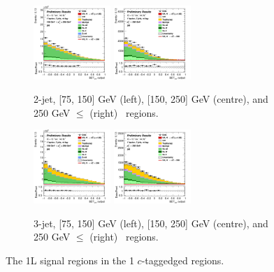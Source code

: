 \begin{figure}[h!]
    \centering
    \begin{subfigure}[b]{\textwidth}
        \centering
        \includegraphics[width=0.32\textwidth]{Images/VH/Own_fit/prefit_VHcc/Region_distmva_BMax250_BMin150_DSR_J2_TTypent_T1_L1_Y6051_Prefit.png}
        \includegraphics[width=0.32\textwidth]{Images/VH/Own_fit/prefit_VHcc/Region_distmva_BMin250_DSR_J2_TTypent_T1_L1_Y6051_Prefit.png}
        \caption{2-jet, [75, 150] GeV (left), [150, 250] GeV (centre), and 250  GeV $\leq$ (right) \ptv\ regions.}
        \label{fig:plots_VHcc_1L_SR_2J_1c}
    \end{subfigure}
    \begin{subfigure}[b]{\textwidth}
        \centering
        \includegraphics[width=0.32\textwidth]{Images/VH/Own_fit/prefit_VHcc/Region_distmva_BMax250_BMin150_DSR_J3_TTypent_T1_L1_Y6051_Prefit.png}
        \includegraphics[width=0.32\textwidth]{Images/VH/Own_fit/prefit_VHcc/Region_distmva_BMin250_DSR_J3_TTypent_T1_L1_Y6051_Prefit.png}
        \caption{3-jet, [75, 150] GeV (left), [150, 250] GeV (centre), and 250  GeV $\leq$ (right) \ptv\ regions.}
        \label{fig:plots_VHcc_1L_SR_3J_1c}
    \end{subfigure}
    \caption{The 1L signal regions in the 1 $c$-taggedged regions.}
    \label{fig:plots_VHcc_1L_SR_1c}
\end{figure}

